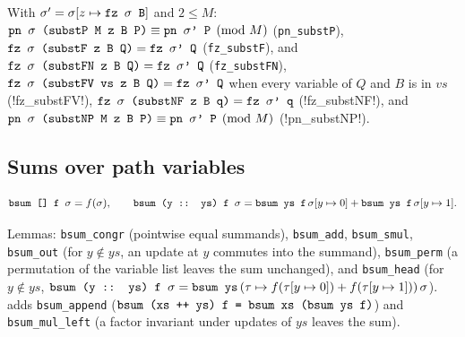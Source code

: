 \begin{proposition}\label{prop:lean-pathsum-subst}
With $\sigma' = \sigma[z\mapsto\textnormal{\texttt{fz \ensuremath{\sigma} B}}]$ and $2\le M$:
$\textnormal{\texttt{pn \ensuremath{\sigma} (\allowbreak{}substP M z B P)}}\equiv\textnormal{\texttt{pn \ensuremath{\sigma}' P}}\pmod M$ (\textnormal{\texttt{pn\_\allowbreak{}substP}}),
$\textnormal{\texttt{fz \ensuremath{\sigma} (\allowbreak{}substF z B Q)}} = \textnormal{\texttt{fz \ensuremath{\sigma}' Q}}$ (\textnormal{\texttt{fz\_\allowbreak{}substF}}), and
$\textnormal{\texttt{fz \ensuremath{\sigma} (\allowbreak{}substFN z B Q)}} = \textnormal{\texttt{fz \ensuremath{\sigma}' Q}}$ (\textnormal{\texttt{fz\_\allowbreak{}substFN}}),
$\textnormal{\texttt{fz \ensuremath{\sigma} (substFV vs z B Q)}} = \textnormal{\texttt{fz \ensuremath{\sigma}' Q}}$ when every variable of $Q$
and $B$ is in $vs$ (\lean!fz_substFV!),
$\textnormal{\texttt{fz \ensuremath{\sigma} (substNF z B q)}} = \textnormal{\texttt{fz \ensuremath{\sigma}' q}}$ (\lean!fz_substNF!), and
$\textnormal{\texttt{pn \ensuremath{\sigma} (substNP M z B P)}}\equiv\textnormal{\texttt{pn \ensuremath{\sigma}' P}}\pmod M$ (\lean!pn_substNP!).
\end{proposition}

\subsection{Sums over path variables}

\begin{definition}\label{def:lean-pathsum-bsum}
\[
\textnormal{\texttt{bsum [] f \ensuremath{\sigma}}} = f(\sigma),\qquad
\textnormal{\texttt{bsum (\allowbreak{}y :: ys) f \ensuremath{\sigma}}} = \textnormal{\texttt{bsum ys f}}\,\sigma[y\mapsto0]+\textnormal{\texttt{bsum ys f}}\,\sigma[y\mapsto1].
\]
\end{definition}
\noindent Lemmas: \textnormal{\texttt{bsum\_\allowbreak{}congr}} (pointwise equal summands), \textnormal{\texttt{bsum\_\allowbreak{}add}},
\textnormal{\texttt{bsum\_\allowbreak{}smul}}, \textnormal{\texttt{bsum\_\allowbreak{}out}} (for $y\notin ys$, an update at $y$ commutes into the summand),
\textnormal{\texttt{bsum\_\allowbreak{}perm}} (a permutation of the variable list leaves the sum unchanged), and
\textnormal{\texttt{bsum\_\allowbreak{}head}} (for $y\notin ys$,
$\textnormal{\texttt{bsum (\allowbreak{}y :: ys) f \ensuremath{\sigma}}} = \textnormal{\texttt{bsum ys}}\,(\tau\mapsto f(\tau[y\mapsto0])+f(\tau[y\mapsto1]))\,\sigma$).
 adds \textnormal{\texttt{bsum\_\allowbreak{}append}} ($\textnormal{\texttt{bsum (\allowbreak{}xs ++ ys) f = bsum xs (\allowbreak{}bsum ys f)}}$) and
\textnormal{\texttt{bsum\_\allowbreak{}mul\_\allowbreak{}left}} (a factor invariant under updates of $ys$ leaves the sum).

